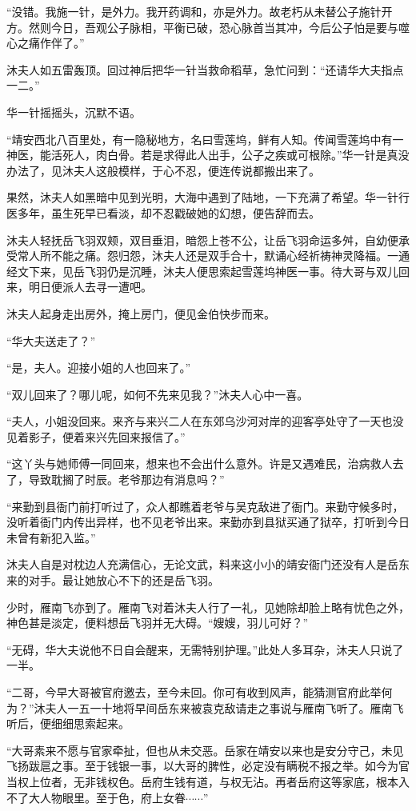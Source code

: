 “没错。我施一针，是外力。我开药调和，亦是外力。故老朽从未替公子施针开方。然则今日，吾观公子脉相，平衡已破，恐心脉首当其冲，今后公子怕是要与噬心之痛作伴了。”

沐夫人如五雷轰顶。回过神后把华一针当救命稻草，急忙问到：“还请华大夫指点一二。”

华一针摇摇头，沉默不语。

“靖安西北八百里处，有一隐秘地方，名曰雪莲坞，鲜有人知。传闻雪莲坞中有一神医，能活死人，肉白骨。若是求得此人出手，公子之疾或可根除。”华一针是真没办法了，见沐夫人这般模样，于心不忍，便连传说都搬出来了。

果然，沐夫人如黑暗中见到光明，大海中遇到了陆地，一下充满了希望。华一针行医多年，虽生死早已看淡，却不忍戳破她的幻想，便告辞而去。

沐夫人轻抚岳飞羽双颊，双目垂泪，暗怨上苍不公，让岳飞羽命运多舛，自幼便承受常人所不能之痛。怨归怨，沐夫人还是双手合十，默诵心经祈祷神灵降福。一通经文下来，见岳飞羽仍是沉睡，沐夫人便思索起雪莲坞神医一事。待大哥与双儿回来，明日便派人去寻一遭吧。

沐夫人起身走出房外，掩上房门，便见金伯快步而来。

“华大夫送走了？”

“是，夫人。迎接小姐的人也回来了。”

“双儿回来了？哪儿呢，如何不先来见我？”沐夫人心中一喜。

“夫人，小姐没回来。来齐与来兴二人在东郊乌沙河对岸的迎客亭处守了一天也没见着影子，便着来兴先回来报信了。”

“这丫头与她师傅一同回来，想来也不会出什么意外。许是又遇难民，治病救人去了，导致耽搁了时辰。老爷那边有消息吗？”

“来勤到县衙门前打听过了，众人都瞧着老爷与吴克敌进了衙门。来勤守候多时，没听着衙门内传出异样，也不见老爷出来。来勤亦到县狱买通了狱卒，打听到今日未曾有新犯入监。”

沐夫人自是对枕边人充满信心，无论文武，料来这小小的靖安衙门还没有人是岳东来的对手。最让她放心不下的还是岳飞羽。

少时，雁南飞亦到了。雁南飞对着沐夫人行了一礼，见她除却脸上略有忧色之外，神色甚是淡定，便料想岳飞羽并无大碍。“嫂嫂，羽儿可好？”

“无碍，华大夫说他不日自会醒来，无需特别护理。”此处人多耳杂，沐夫人只说了一半。

“二哥，今早大哥被官府邀去，至今未回。你可有收到风声，能猜测官府此举何为？”沐夫人一五一十地将早间岳东来被袁克敌请走之事说与雁南飞听了。雁南飞听后，便细细思索起来。

“大哥素来不愿与官家牵扯，但也从未交恶。岳家在靖安以来也是安分守己，未见飞扬跋扈之事。至于钱银一事，以大哥的脾性，必定没有瞒税不报之举。如今为官当权上位者，无非钱权色。岳府生钱有道，与权无沾。再者岳府这等家底，根本入不了大人物眼里。至于色，府上女眷$\cdots\cdots$”


